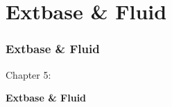 %

\section{Extbase \& Fluid}
\begin{frame}[fragile]
	\frametitle{Extbase \& Fluid}

	\begin{center}\huge{Chapter 5:}\end{center}
	\begin{center}\huge{\color{typo3darkgrey}\textbf{Extbase \& Fluid}}\end{center}

\end{frame}


